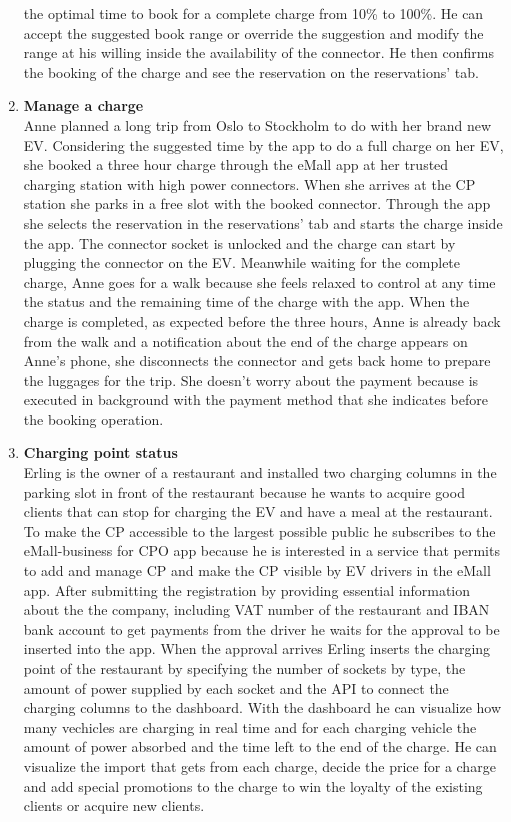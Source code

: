 \begin{enumerate}[label=\textbf{\Alph*}.]
            the optimal time to book for a complete charge from 10\% to 100\%.
            He can accept the suggested book range or override the suggestion and modify the range at his willing inside the
            availability of the connector. He then confirms the booking of the charge and see the reservation on the reservations' tab.
      \item \textbf{Manage a charge} \\
            Anne planned a long trip from Oslo to Stockholm to do with her brand new EV. 
            Considering the suggested time by the app to do a full charge on her EV, she booked a three hour charge through the eMall 
            app at her trusted charging station with high power connectors.
            When she arrives at the CP station she parks in a free slot with the booked connector. Through the app she selects
            the reservation in the reservations' tab and starts the charge inside the app. The connector socket is unlocked and
            the charge can start by plugging the connector on the EV. Meanwhile waiting for the complete charge, Anne goes for a walk
            because she feels relaxed to control at any time the status and the remaining time of the charge with the app. When the charge
            is completed, as expected before the three hours, Anne is already back from the walk and a notification about the end of the charge 
            appears on Anne's phone, she disconnects the connector and gets back home to prepare the luggages for the trip. She doesn't worry about 
            the payment because is executed in background with the payment method that she indicates before the booking operation.
      \item \textbf{Charging point status} \\
            Erling is the owner of a restaurant and installed two charging columns in the parking slot in front of the restaurant because
            he wants to acquire good clients that can stop for charging the EV and have a meal at the restaurant. To make the CP accessible to the largest
            possible public he subscribes to the eMall-business for CPO app because he is interested in a service that permits to add and manage CP and make 
            the CP visible by EV drivers in the eMall app. After submitting the registration by providing essential information about the the company, including 
            VAT number of the restaurant and IBAN bank account to get payments from the driver he waits for the approval to be inserted into the app.
            When the approval arrives Erling inserts the charging point of the restaurant by specifying the number of sockets by type, the amount of power supplied by
            each socket and the API to connect the charging columns to the dashboard. With the dashboard he can visualize how many vechicles are charging in real time 
            and for each charging vehicle the amount of power absorbed and the time left to the end of the charge. He can visualize the import that gets from each 
            charge, decide the price for a charge and add special promotions to the charge to win the loyalty of the existing clients or acquire new clients.
\end{enumerate}

